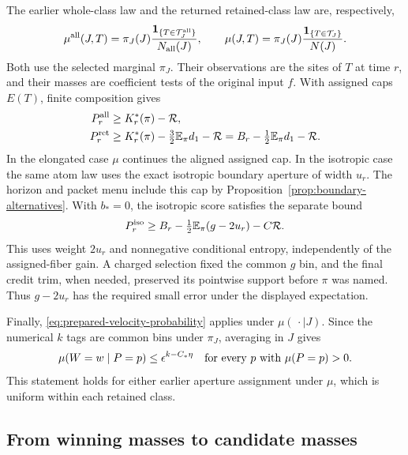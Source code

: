The earlier whole-class law and the returned retained-class law are,
respectively,
\begin{equation}
 \mu^{\rm all}(J,T)=\pi_J(J)
   \frac{\boldsymbol1_{\{T\in\mathcal T_J^{\rm all}\}}}{N_{\rm all}(J)},
 \qquad
 \mu(J,T)=\pi_J(J)
   \frac{\boldsymbol1_{\{T\in\mathcal T_J\}}}{N(J)}.
 \label{eq:repayment-earlier-laws}
\end{equation}
Both use the selected marginal \(\pi_J\).  Their observations are
the sites of \(T\) at time \(r\), and their masses are coefficient
tests of the original input \(f\).  With assigned caps \(E(T)\),
finite composition gives
\begin{align}
 P_r^{\rm all}&\ge K_r^*(\pi)-\mathcal R,\nonumber\\
 P_r^{\rm ret}&\ge K_r^*(\pi)-\tfrac32\mathbb E_\pi d_1-\mathcal R
       =B_r-\tfrac12\mathbb E_\pi d_1-\mathcal R .
 \label{eq:repayment-earlier-scores}
\end{align}
In the elongated case \(\mu\) continues the aligned assigned cap.
In the isotropic case the same atom law uses the exact isotropic boundary aperture
of width \(u_r\).  The horizon and packet menu include this cap by
Proposition~\ref{prop:boundary-alternatives}.  With \(b_*=0\),
the isotropic score satisfies the separate bound
\begin{equation}
 P_r^{\rm iso}\ge
 B_r-\tfrac12\mathbb E_\pi(g-2u_r)-C\mathcal R .
 \label{eq:repayment-isotropic-score}
\end{equation}
This uses weight \(2u_r\) and nonnegative conditional entropy,
independently of the assigned-fiber gain.  A charged selection fixed
the common \(g\) bin, and the final credit trim, when needed,
preserved its pointwise support before \(\pi\) was named.  Thus \(g-2u_r\) has
the required small error under the displayed expectation.

Finally, \eqref{eq:prepared-velocity-probability} applies under
\(\mu(\,\cdot\mid J)\).  Since the numerical \(k\) tags are common
bins under \(\pi_J\), averaging in \(J\) gives
\begin{equation}
 \mu(W=w\mid P=p)\le\epsilon^{k-C_*\eta}
 \quad\text{for every \(p\) with \(\mu(P=p)>0\)}.
 \label{eq:repayment-outgoing-credit}
\end{equation}
This statement holds for either earlier aperture assignment under
\(\mu\), which is uniform within each retained class.


\subsection{From winning masses to candidate masses}

